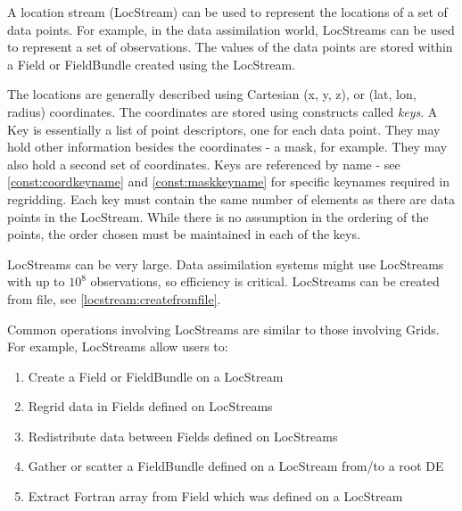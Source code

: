 %

A location stream (LocStream) can be used to represent the locations of
a set of data points.  For example, in the data assimilation world, 
LocStreams can be used to represent a set of observations.  The values 
of the data points are stored within a Field or FieldBundle created 
using the LocStream.

The locations are generally described using Cartesian (x, y, z), or 
(lat, lon, radius) coordinates.  The coordinates are stored using 
constructs called {\it keys}.  A Key is essentially a list of point 
descriptors, one for each data point.  They may hold other information 
besides the coordinates - a mask, for example.  They may also hold a 
second set of coordinates.    Keys are referenced by name - see 
\ref{const:coordkeyname} and \ref{const:maskkeyname} for specific 
keynames required in regridding.  Each key must contain the same 
number of elements as there are data points in the LocStream.  While 
there is no assumption in the ordering of the points, the order 
chosen must be maintained in each of the keys.

LocStreams can be very large. Data assimilation systems might use
LocStreams with up to $10^{8}$ observations, so efficiency is critical.
LocStreams can be created from file, see \ref{locstream:createfromfile}.

Common operations involving LocStreams are similar to those involving Grids.
For example, LocStreams allow users to:

\begin{enumerate}
\item Create a Field or FieldBundle on a LocStream
\item Regrid data in Fields defined on LocStreams
\item Redistribute data between Fields defined on LocStreams
\item Gather or scatter a FieldBundle defined on a LocStream from/to a root DE
\item Extract Fortran array from Field which was defined on a LocStream
\end{enumerate}


